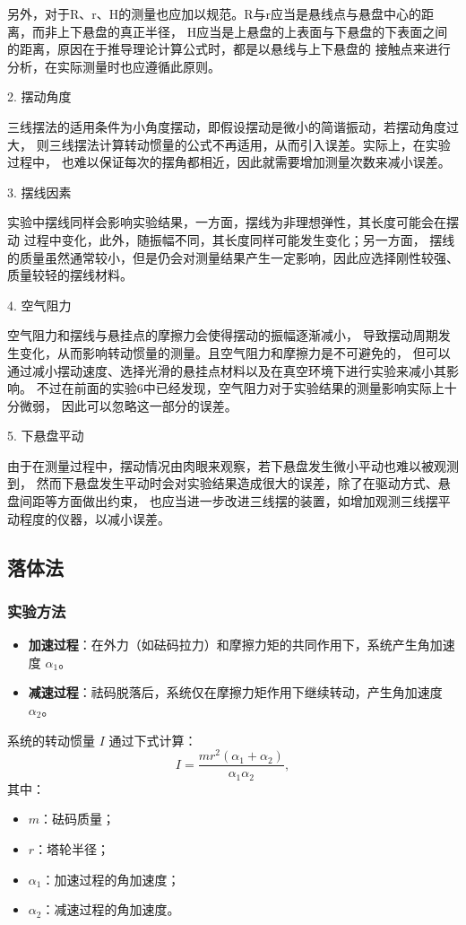 \documentclass[12pt,hyperref,a4paper,UTF8]{ctexart}
\begin{document}
另外，对于R、r、H的测量也应加以规范。R与r应当是悬线点与悬盘中心的距离，而非上下悬盘的真正半径，
H应当是上悬盘的上表面与下悬盘的下表面之间的距离，原因在于推导理论计算公式时，都是以悬线与上下悬盘的
接触点来进行分析，在实际测量时也应遵循此原则。

2. 摆动角度

三线摆法的适用条件为小角度摆动，即假设摆动是微小的简谐振动，若摆动角度过大，
则三线摆法计算转动惯量的公式不再适用，从而引入误差。实际上，在实验过程中，
也难以保证每次的摆角都相近，因此就需要增加测量次数来减小误差。

3. 摆线因素

实验中摆线同样会影响实验结果，一方面，摆线为非理想弹性，其长度可能会在摆动
过程中变化，此外，随振幅不同，其长度同样可能发生变化；另一方面，
摆线的质量虽然通常较小，但是仍会对测量结果产生一定影响，因此应选择刚性较强、质量较轻的摆线材料。

4. 空气阻力

空气阻力和摆线与悬挂点的摩擦力会使得摆动的振幅逐渐减小，
导致摆动周期发生变化，从而影响转动惯量的测量。且空气阻力和摩擦力是不可避免的，
但可以通过减小摆动速度、选择光滑的悬挂点材料以及在真空环境下进行实验来减小其影响。
不过在前面的实验6中已经发现，空气阻力对于实验结果的测量影响实际上十分微弱，
因此可以忽略这一部分的误差。

5. 下悬盘平动

由于在测量过程中，摆动情况由肉眼来观察，若下悬盘发生微小平动也难以被观测到，
然而下悬盘发生平动时会对实验结果造成很大的误差，除了在驱动方式、悬盘间距等方面做出约束，
也应当进一步改进三线摆的装置，如增加观测三线摆平动程度的仪器，以减小误差。


\subsection{落体法}
\subsubsection{实验方法}
\begin{itemize}
    \item \textbf{加速过程}：在外力（如砝码拉力）和摩擦力矩的共同作用下，系统产生角加速度 $\alpha_1$。
    \item \textbf{减速过程}：祛码脱落后，系统仅在摩擦力矩作用下继续转动，产生角加速度 $\alpha_2$。
\end{itemize}

系统的转动惯量 $I$ 通过下式计算：
\begin{equation}
    I = \frac{m r^2 (\alpha_1 + \alpha_2)}{\alpha_1 \alpha_2},
\end{equation}
其中：
\begin{itemize}
    \item $m$：砝码质量；
    \item $r$：塔轮半径；
    \item $\alpha_1$：加速过程的角加速度；
    \item $\alpha_2$：减速过程的角加速度。
\end{itemize}
\end{document}
